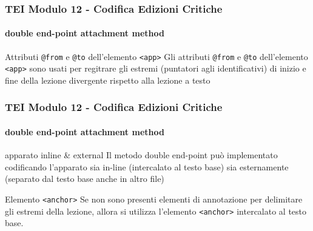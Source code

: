 \begin{frame}
    \frametitle{TEI Modulo 12 - Codifica Edizioni Critiche}
    \framesubtitle{double end-point attachment method}
    \addtocounter{nframe}{1}
    



    \begin{block}{Attributi \texttt{@from} e \texttt{@to} dell'elemento \texttt{<app>}}
      Gli attributi \texttt{@from} e \texttt{@to} dell'elemento \texttt{<app>} sono usati per regitrare gli estremi (puntatori agli identificativi) di inizio e fine della lezione divergente rispetto alla lezione a testo
    \end{block}
    

\end{frame}


\begin{frame}
    \frametitle{TEI Modulo 12 - Codifica Edizioni Critiche}
    \framesubtitle{double end-point attachment method}
    \addtocounter{nframe}{1}
    


   

    \begin{block}{apparato inline & external}
      Il metodo double end-point può implementato codificando l'apparato sia in-line (intercalato al testo base) sia esternamente (separato dal testo base anche in altro file)  
    \end{block}
    
    \begin{block}{Elemento \texttt{<anchor>}}
        Se non sono presenti elementi di annotazione per delimitare gli estremi della lezione, allora si utilizza l'elemento \texttt{<anchor>} intercalato al testo base.
     \end{block}

\end{frame}


